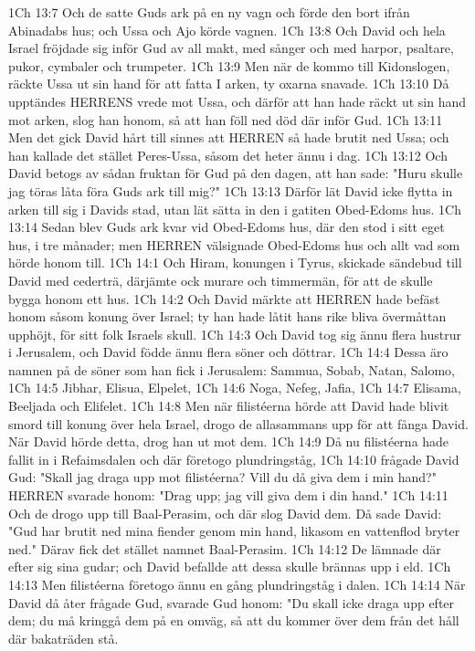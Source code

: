 1Ch 13:7  Och de satte Guds ark på en ny vagn och förde den bort ifrån Abinadabs hus; och Ussa och Ajo körde vagnen.
1Ch 13:8  Och David och hela Israel fröjdade sig inför Gud av all makt, med sånger och med harpor, psaltare, pukor, cymbaler och trumpeter.
1Ch 13:9  Men när de kommo till Kidonslogen, räckte Ussa ut sin hand för att fatta I arken, ty oxarna snavade.
1Ch 13:10  Då upptändes HERRENS vrede mot Ussa, och därför att han hade räckt ut sin hand mot arken, slog han honom, så att han föll ned död där inför Gud.
1Ch 13:11  Men det gick David hårt till sinnes att HERREN så hade brutit ned Ussa; och han kallade det stället Peres-Ussa, såsom det heter ännu i dag.
1Ch 13:12  Och David betogs av sådan fruktan för Gud på den dagen, att han sade: "Huru skulle jag töras låta föra Guds ark till mig?"
1Ch 13:13  Därför lät David icke flytta in arken till sig i Davids stad, utan lät sätta in den i gatiten Obed-Edoms hus.
1Ch 13:14  Sedan blev Guds ark kvar vid Obed-Edoms hus, där den stod i sitt eget hus, i tre månader; men HERREN välsignade Obed-Edoms hus och allt vad som hörde honom till.
1Ch 14:1  Och Hiram, konungen i Tyrus, skickade sändebud till David med cederträ, därjämte ock murare och timmermän, för att de skulle bygga honom ett hus.
1Ch 14:2  Och David märkte att HERREN hade befäst honom såsom konung över Israel; ty han hade låtit hans rike bliva övermåttan upphöjt, för sitt folk Israels skull.
1Ch 14:3  Och David tog sig ännu flera hustrur i Jerusalem, och David födde ännu flera söner och döttrar.
1Ch 14:4  Dessa äro namnen på de söner som han fick i Jerusalem: Sammua, Sobab, Natan, Salomo,
1Ch 14:5  Jibhar, Elisua, Elpelet,
1Ch 14:6  Noga, Nefeg, Jafia,
1Ch 14:7  Elisama, Beeljada och Elifelet.
1Ch 14:8  Men när filistéerna hörde att David hade blivit smord till konung över hela Israel, drogo de allasammans upp för att fånga David. När David hörde detta, drog han ut mot dem.
1Ch 14:9  Då nu filistéerna hade fallit in i Refaimsdalen och där företogo plundringståg,
1Ch 14:10  frågade David Gud: "Skall jag draga upp mot filistéerna? Vill du då giva dem i min hand?" HERREN svarade honom: "Drag upp; jag vill giva dem i din hand."
1Ch 14:11  Och de drogo upp till Baal-Perasim, och där slog David dem. Då sade David: "Gud har brutit ned mina fiender genom min hand, likasom en vattenflod bryter ned." Därav fick det stället namnet Baal-Perasim.
1Ch 14:12  De lämnade där efter sig sina gudar; och David befallde att dessa skulle brännas upp i eld.
1Ch 14:13  Men filistéerna företogo ännu en gång plundringståg i dalen.
1Ch 14:14  När David då åter frågade Gud, svarade Gud honom: "Du skall icke draga upp efter dem; du må kringgå dem på en omväg, så att du kommer över dem från det håll där bakaträden stå.
